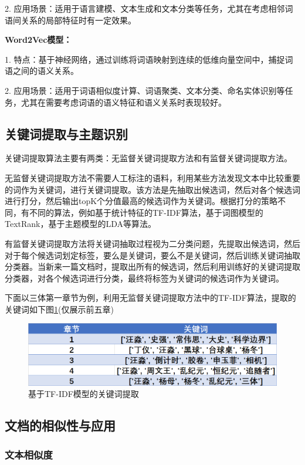 \documentclass[12pt]{xjtureport}
\begin{document}
2.	应用场景：适用于语言建模、文本生成和文本分类等任务，尤其在考虑相邻词语间关系的局部特征时有一定效果。

\textbf{Word2Vec模型：}

1.	特点：基于神经网络，通过训练将词语映射到连续的低维向量空间中，捕捉词语之间的语义关系。

2.	应用场景：适用于词语相似度计算、词语聚类、文本分类、命名实体识别等任务，尤其在需要考虑词语的语义特征和语义关系时表现较好。

\subsection{关键词提取与主题识别}

关键词提取算法主要有两类：无监督关键词提取方法和有监督关键词提取方法。

无监督关键词提取方法不需要人工标注的语料，利用某些方法发现文本中比较重要的词作为关键词，进行关键词提取。该方法是先抽取出候选词，然后对各个候选词进行打分，然后输出topK个分值最高的候选词作为关键词。根据打分的策略不同，有不同的算法，例如基于统计特征的TF-IDF算法，基于词图模型的TextRank，基于主题模型的LDA等算法。

有监督关键词提取方法将关键词抽取过程视为二分类问题，先提取出候选词，然后对于每个候选词划定标签，要么是关键词，要么不是关键词，然后训练关键词抽取分类器。当新来一篇文档时，提取出所有的候选词，然后利用训练好的关键词提取分类器，对各个候选词进行分类，最终将标签为关键词的候选词作为关键词。

下面以三体第一章节为例，利用无监督关键词提取方法中的TF-IDF算法，提取的关键词如下图\ref{TF-IDF}(仅展示前五章)

\begin{figure}[!htbp]
    \centering
    \includegraphics[width=0.8\linewidth]{figures/TF-IDF关键词.jpg}
    \caption{基于TF-IDF模型的关键词提取}
    \label{TF-IDF}
\end{figure}

\subsection{文档的相似性与应用}

\subsubsection{文本相似度}
\end{document}
